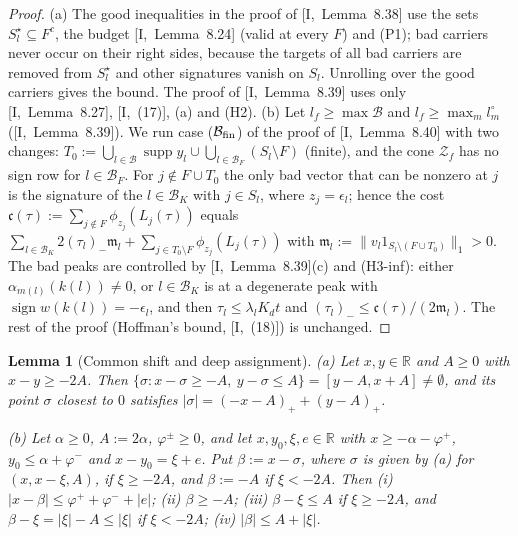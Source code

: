 \documentclass[10pt]{amsart}
\newtheorem{lemma}[theorem]{Lemma}
\theoremstyle{definition}
\theoremstyle{remark}
\newcommand{\supp}{\operatorname{supp}}
\newcommand{\sgn}{\operatorname{sign}}
\newcommand{\R}{\mathbb R}
\begin{document}
\begin{proof}
(a) The good inequalities in the proof of [I,~Lemma~8.38] use the sets
$S^\star_l\subseteq F^c$, the budget [I,~Lemma~8.24] (valid at every $F$) and
(P1); bad carriers never occur on their right sides, because the targets of
all bad carriers are removed from $S^\star_l$ and other signatures vanish
on $S_l$.  Unrolling over the good carriers gives the bound.  The proof of
[I,~Lemma~8.39] uses only [I,~Lemma~8.27], [I,~(17)], (a) and (H2).
(b) Let $l_f\ge\max\mathcal B$ and $l_f\ge\max_ml^\circ_m$
([I,~Lemma~8.39]).  We run case ($\mathcal B_{\rm fin}$) of the proof of
[I,~Lemma~8.40] with two changes: $T_0:=\bigcup_{l\in\mathcal B}\supp y_l\cup
\bigcup_{l\in\mathcal B_F}(S_l\setminus F)$ (finite), and the cone
$\mathcal Z_f$ has no sign row for $l\in\mathcal B_F$.  For $j\notin F\cup
T_0$ the only bad vector that can be nonzero at $j$ is the signature of the
$l\in\mathcal B_K$ with $j\in S_l$, where $z_j=\epsilon_l$; hence the cost
$\mathfrak c(\tau):=\sum_{j\notin F}\phi_{z_j}(L_j(\tau))$ equals
$\sum_{l\in\mathcal B_K}2(\tau_l)_-\mathfrak m_l+\sum_{j\in T_0\setminus F}
\phi_{z_j}(L_j(\tau))$ with $\mathfrak m_l:=\|v_l1_{S_l\setminus(F\cup T_0)}
\|_1>0$.  The bad peaks are controlled by [I,~Lemma~8.39](c) and (H3-inf):
either $\alpha_{m(l)}(k(l))\ne0$, or $l\in\mathcal B_K$ is at a degenerate peak
with $\sgn w(k(l))=-\epsilon_l$, and then $\tau_l\le\lambda_lK_dt$ and
$(\tau_l)_-\le\mathfrak c(\tau)/(2\mathfrak m_l)$.  The rest of the proof
(Hoffman's bound, [I,~(18)]) is unchanged.
\end{proof}

\begin{lemma}[Common shift and deep assignment]\label{lem:II-commonshift}
\textup{(a)} Let $x,y\in\R$ and $A\ge0$ with $x-y\ge-2A$.  Then
$\{\sigma:x-\sigma\ge-A,\ y-\sigma\le A\}=[y-A,x+A]\ne\emptyset$, and its
point $\sigma$ closest to $0$ satisfies $|\sigma|=(-x-A)_++(y-A)_+$.

\textup{(b)} Let $\alpha\ge0$, $A:=2\alpha$, $\varphi^\pm\ge0$, and let
$x,y_0,\xi,e\in\R$ with $x\ge-\alpha-\varphi^+$, $y_0\le\alpha+\varphi^-$ and
$x-y_0=\xi+e$.  Put $\beta:=x-\sigma$, where $\sigma$ is given by \textup{(a)}
for $(x,x-\xi,A)$, if $\xi\ge-2A$, and $\beta:=-A$ if $\xi<-2A$.  Then
\textup{(i)} $|x-\beta|\le\varphi^++\varphi^-+|e|$; \textup{(ii)}
$\beta\ge-A$; \textup{(iii)} $\beta-\xi\le A$ if $\xi\ge-2A$, and
$\beta-\xi=|\xi|-A\le|\xi|$ if $\xi<-2A$; \textup{(iv)} $|\beta|\le A+|\xi|$.
\end{lemma}
\end{document}
